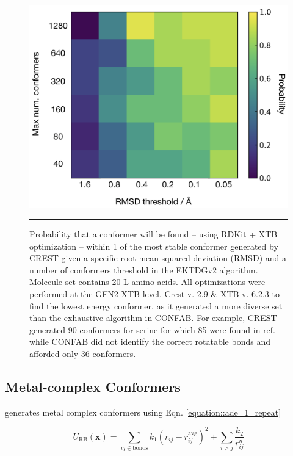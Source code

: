 \documentclass[../../main.tex]{subfiles}
\begin{document}
\begin{figure}[h!]
	\vspace{0.4cm}
	\centering
	\includegraphics[width=12cm]{5/autode/figs/figS2}
	\vspace{0.4cm}
	\hrule
	\caption{Probability that a conformer will be found -- using RDKit + XTB optimization -- within 1 \kcalx of the most stable conformer generated by CREST given a specific root mean squared deviation (RMSD) and a number of conformers threshold in the EKTDGv2 algorithm. Molecule set contains 20 L-amino acids. All optimizations were performed at the GFN2-XTB level. Crest v. 2.9 \& XTB v. 6.2.3 to find the lowest energy conformer, as it generated a more diverse set than the exhaustive algorithm in CONFAB. For example, CREST generated 90 conformers for serine for which 85 were found in ref. \cite{He2016} while CONFAB did not identify the correct rotatable bonds and afforded only 36 conformers.}
	\label{fig::ade_si_2}
\end{figure}

\clearpage
\subsection{Metal-complex Conformers}
\label{section::ade_si_metal_complex_confs}

\ade generates metal complex conformers using Eqn. \eqref{equation::ade_1_repeat}


\begin{equation}
	U_\text{RB}(\boldsymbol{x}) = \sum_{ij \in \text{bonds}} k_1 (r_{ij} - r_{ij}^\text{avg})^2 + \sum_{i > j} \frac{k_2}{r_{ij}^n}
	\label{equation::ade_1_repeat}
\end{equation}
\end{document}
